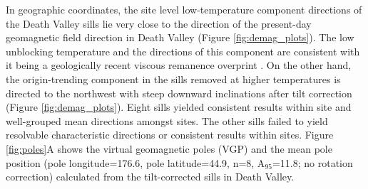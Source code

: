 In geographic coordinates, the site level low-temperature component directions of the Death Valley sills lie very close to the direction of the present-day geomagnetic field direction in Death Valley (Figure \ref{fig:demag_plots}). The low unblocking temperature and the directions of this component are consistent with it being a geologically recent viscous remanence overprint \citep{ Moskowitz1998a, Muxworthy2000a}. On the other hand, the origin-trending component in the sills removed at higher temperatures is directed to the northwest with steep downward inclinations after tilt correction (Figure \ref{fig:demag_plots}). Eight sills yielded consistent results within site and well-grouped mean directions amongst sites. The other sills failed to yield resolvable characteristic directions or consistent results within sites. Figure \ref{fig:poles}A shows the virtual geomagnetic poles (VGP) and the mean pole position (pole longitude=176.6\textdegree, pole latitude=44.9\textdegree, n=8, A$_{95}$=11.8\textdegree; no rotation correction) calculated from the tilt-corrected sills in Death Valley.

